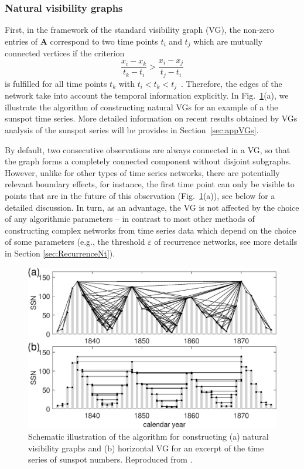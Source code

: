 		\subsubsection{Natural visibility graphs}
		First, in the framework of the standard visibility graph (VG), the non-zero entries of $\mathbf{A}$ correspond to two time points $t_i$ and $t_j$ which are mutually connected vertices if the criterion 
\begin{equation} \label{vis_cond}
	\frac{x_i-x_k}{t_k - t_i} > \frac{x_i - x_j}{t_j - t_i}
\end{equation}
is fulfilled for all time points $t_k$ with $t_i < t_k < t_j$~\cite{Lacasa2008}. Therefore, the edges of the network take into account the temporal information explicitly. In Fig.~\ref{fig_chap04:timeseriesSS}(a), we illustrate the algorithm of constructing natural VGs for an example of a the sunspot time series. More detailed information on recent results obtained by VGs analysis of the sunspot series will be provides in Section~\ref{sec:appVGs}. 

By default, two consecutive observations are always connected in a VG, so that the graph forms a completely connected component without disjoint subgraphs. However, unlike for other types of time series networks, there are potentially relevant boundary effects, for instance, the first time point can only be visible to points that are in the future of this observation (Fig.~\ref{fig_chap04:timeseriesSS}(a)), see below for a detailed discussion. In turn, as an advantage, the VG is not affected by the choice of any algorithmic parameters -- in contrast to most other methods of constructing complex networks from time series data which depend on the choice of some parameters (e.g., the threshold $\varepsilon$ of recurrence networks, see more details in Section \ref{sec:RecurrenceNt}). 
		\begin{figure}
		  \centering
		  \includegraphics[width=0.8\columnwidth]{Chapter04_VisibilityGt/TSspotnumberYear.eps}
		  \caption{Schematic illustration of the algorithm for constructing (a) natural visibility graphs and (b) horizontal VG for an excerpt of the time series of sunspot numbers. Reproduced from \cite{Zou2014}. \label{fig_chap04:timeseriesSS}}
		\end{figure}
		
